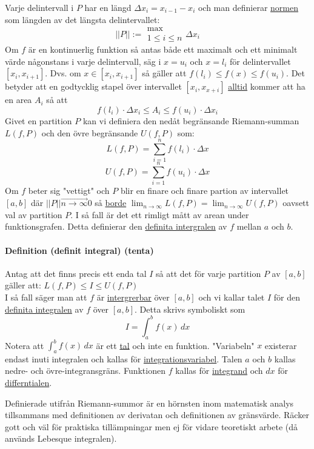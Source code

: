 Varje delintervall i $P$ har en längd $\Delta x_i=x_{i-1}-x_i$ och man definierar \underline{normen} som längden av det längsta delintervallet:
\begin{equation*}
    ||P||:=\begin{matrix}
        \text{max} \\
        1\leq i \leq n
    \end{matrix}\Delta x_i
\end{equation*}
Om $f$ är en kontinuerlig funktion så antas både ett maximalt och ett minimalt värde någonstans i varje delintervall, säg i $x=u_i$ och $x=l_i$ för delintervallet $[x_i,x_{i+1}]$.
Dvs. om $x\in[x_i,x_{i+1}]$ så gäller att $f(l_i)\leq f(x)\leq f(u_i)$.
Det betyder att en godtycklig stapel över intervallet $[x_i,x_{x+i}]$ \underline{alltid} kommer att ha en area $A_i$ så att
\begin{equation*}
    f(l_i)\cdot\Delta x_i\leq A_i\leq f(u_i)\cdot\Delta x_i
\end{equation*}
Givet en partition $P$ kan vi definiera den nedåt begränsande Riemann-summan $L(f,P)$ och den övre begränsande $U(f,P)$ som:
\begin{equation*}
    L(f,P)=\sum_{i=1}^n f(l_i)\cdot\Delta x
\end{equation*}
\begin{equation*}
    U(f,P)=\sum_{i=1}^n f(u_i)\cdot\Delta x
\end{equation*}
Om $f$ beter sig "vettigt" och $P$ blir en finare och finare partion av intervallet $[a,b]$ där $||P||\overrightarrow{n\to\infty}0$ så \underline{borde} $\lim_{n\to\infty}L(f,P)=\lim_{n\to\infty}U(f,P)$ oavsett val av partition $P$.
I så fall är det ett rimligt mått av arean under funktionsgrafen.
Detta definierar den \underline{definita intergralen} av $f$ mellan $a$ och $b$.

\paragraph{Definition (definit integral) (tenta)} Antag att det finns precis ett enda tal $I$ så att det för varje partition $P$ av $[a,b]$ gäller att: $L(f,P)\leq I\leq U(f,P)$\\
I så fall säger man att $f$ är \underline{intergrerbar} över $[a,b]$ och vi kallar talet $I$ för den \underline{definita integralen} av $f$ över $[a,b]$.
Detta skrivs symboliskt som
\begin{equation*}
    I=\int_{a}^{b} f(x) \,dx
\end{equation*}
Notera att $\int_{a}^{b} f(x) \,dx$ är ett \underline{tal} och inte en funktion.
"Variabeln" $x$ existerar endast inuti integralen och kallas för \underline{integrationsvariabel}.
Talen $a$ och $b$ kallas nedre- och övre-integransgräns.
Funktionen $f$ kallas för \underline{integrand} och $dx$ för \underline{differntialen}.


Definierade utifrån Riemann-summor är en hörnsten inom matematisk analys tillsammans med definitionen av derivatan och definitionen av gränsvärde.
Räcker gott och väl för praktiska tillämpningar men ej för vidare teoretiskt arbete (då används Lebesque integralen).